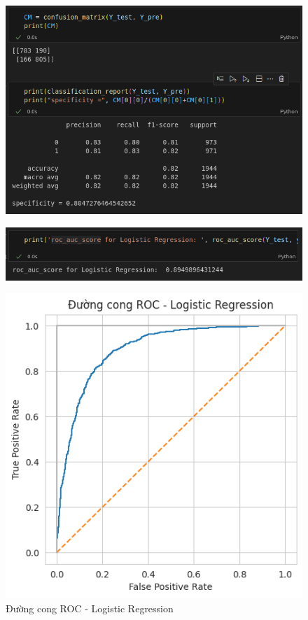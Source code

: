 \documentclass[11pt]{article}
\begin{document}
	\begin{figure}[H]
		\centering
		\includegraphics[width=0.7\linewidth]{LogisticRegression/screenshot002}
		\caption{}
		\label{fig:screenshot002}
	\end{figure}
	
	\begin{figure}[H]
		\centering
		\includegraphics[width=0.7\linewidth]{LogisticRegression/screenshot003}
		\caption{}
		\label{fig:screenshot003}
	\end{figure}
	
	\begin{figure}[H]
		\centering
		\includegraphics[width=0.7\linewidth]{LogisticRegression/DuongCongROC}
		\caption{Đường cong ROC - Logistic Regression}
		\label{fig:duongcongroc}
	\end{figure}
	
\end{document}
